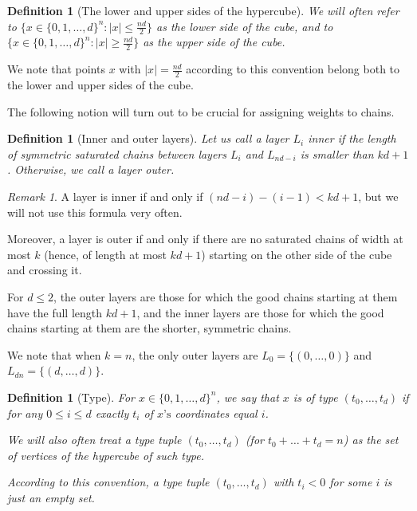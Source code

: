 \documentclass[11pt, reqno]{amsart}
\newcommand{\leanblueprintbase}{https://mj141592.github.io/weighted-chains-paper}
\newif\ifleanlinks
\newcommand{\leanblueprint}[1]{%
  \ifleanlinks
    \leavevmode\unskip\penalty9999\hbox{}\nobreak\hfill\quad
    \href{\leanblueprintbase/theorems/#1/}{%
      \mbox{\normalfont\footnotesize\textcolor{blue}{[\textsf{Lean formalisation}]}}}%
    \par\nobreak
  \fi
}
\newtheorem{definition}[theorem]{Definition}
\theoremstyle{remark}
\newtheorem*{remark}{Remark}
\numberwithin{equation}{section}
\newcommand{\thehypercube}{\{0, 1, \ldots, d\}^n}
\begin{document}
\begin{definition}[The lower and upper sides of the hypercube]
\label{wc:def:cube-sides}
    We will often refer to $\{x \in \thehypercube: \vert x\vert  \leqslant \frac{nd}{2}\}$ as the lower side of the cube, and to $\{x \in \thehypercube: \vert x\vert  \geqslant \frac{nd}{2}\}$ as the upper side of the cube.
\leanblueprint{cube-sides}
\end{definition}

We note that points $x$ with $|x| = \frac{nd}{2}$ according to this convention belong both to the lower and upper sides of the cube.

The following notion will turn out to be crucial for assigning weights to chains.
\begin{definition}[Inner and outer layers]
\label{wc:def:inner-outer-layers}
    Let us call a layer $L_i$ inner if the length of symmetric saturated chains between layers $L_i$ and $L_{nd-i}$ is smaller than $kd+1$. Otherwise, we call a layer outer.
\leanblueprint{inner-outer-layers}
\end{definition}

\begin{remark}
    A layer is inner if and only if $(nd-i)-(i-1) < kd+1$, but we will not use this formula very often.
    
    Moreover, a layer is outer if and only if there are no saturated chains of width at most $k$ (hence, of length at most $kd+1$) starting on the other side of the cube and crossing it.
\end{remark}

For $d \leqslant 2$, the outer layers are those for which the good chains starting at them have the full length $kd+1$, and the inner layers are those for which the good chains starting at them are the shorter, symmetric chains.

We note that when $k=n$, the only outer layers are $L_0=\{(0, \ldots, 0)\}$ and $L_{dn}=\{(d, \ldots, d)\}.$

\begin{definition}[Type]
\label{wc:def:type}
    For $x \in \thehypercube$, we say that $x$ is of type $(t_0, \ldots, t_d)$ if for any $0 \leqslant i \leqslant d$ exactly $t_i$ of $x\text{'s}$ coordinates equal $i$.

    We will also often treat a type tuple $(t_0, \ldots, t_d)$ (for $t_0+\ldots+t_d=n$) as the set of vertices of the hypercube of such type.

    According to this convention, a type tuple $(t_0, \ldots, t_d)$ with $t_i < 0$ for some $i$ is just an empty set.
\leanblueprint{type}
\end{definition}
\end{document}

